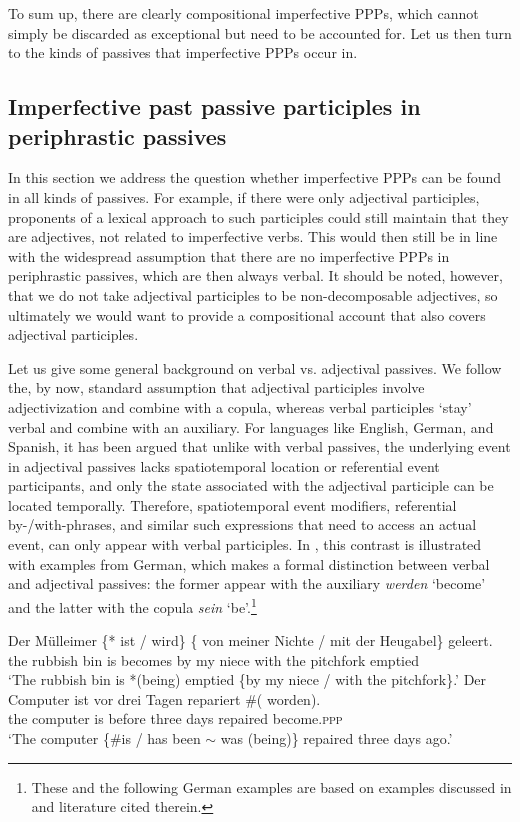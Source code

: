 \documentclass[output=paper,modfonts,newtxmath,hidelinks
]{langscibook}
\begin{document}
To sum up, there are clearly compositional imperfective PPPs, which cannot simply be discarded as exceptional but need to be accounted for. Let us then turn to the kinds of passives that imperfective PPPs occur in.

\subsection{Imperfective past passive participles in periphrastic passives} 
\label{passive}

In this section we address the question whether imperfective PPPs can be found in all kinds of passives. For example, if there were only adjectival participles, proponents of a lexical approach to such participles could still maintain that they are adjectives, not related to imperfective verbs. This would then still be in line with the widespread assumption that there are no imperfective PPPs in periphrastic passives, which are then always verbal. It should be noted, however, that we do not take adjectival participles to be non-decomposable adjectives, so ultimately we would want to provide a compositional account that also covers adjectival participles.

Let us give some general background on verbal vs. adjectival passives. We follow the, by now, standard assumption that adjectival participles involve adjectivization and combine with a copula, whereas verbal participles `stay' verbal and combine with an auxiliary. For languages like English, German, and Spanish, it has been argued \citep[see][and literature cited therein]{gehrkesub15, gehrkenllt, gehrkemarcolingua, alexiadou+lingua} that unlike with verbal passives, the underlying event in adjectival passives lacks spatiotemporal location or referential event participants, and only the state associated with the adjectival participle can be located temporally. Therefore, spatiotemporal event modifiers, referential by-/with-phrases, and similar such expressions that need to access an actual event, can only appear with verbal participles. In , this contrast is illustrated with examples from German, which makes a formal distinction between verbal and adjectival passives: the former appear with the auxiliary \textit{werden} `become' and the latter with the copula \textit{sein} `be'.\footnote{These and the following German examples are based on examples discussed in \citet{gehrkenllt} and literature cited therein.}

\ea\label{reifen}
\ea\gll	Der M\"{u}lleimer \{*\hspace{-2pt} ist / wird\} \{\hspace{-2pt} von meiner Nichte / mit der Heugabel\} geleert.\\
	the {rubbish bin} {} is {} becomes {} by my niece {} with the pitchfork emptied\\
\glt	`The rubbish bin is *(being) emptied \{by my niece / with the pitchfork\}.'
\ex\gll	Der Computer ist vor drei Tagen repariert \#(\hspace{-2pt} worden).\\
	the computer is before three days repaired {} become.\textsc{ppp} \\
\glt	`The computer \{\#is / has been $\sim$ was (being)\} repaired three days ago.'
\z\z
\end{document}
